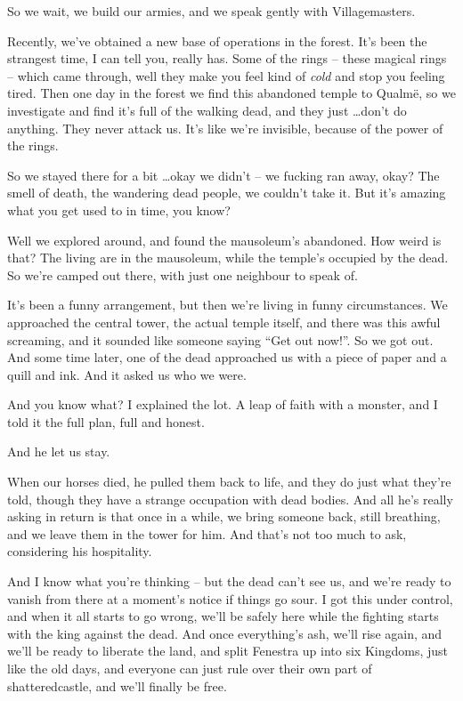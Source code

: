 \begin{multicols}{2}
\begin{exampletext}
	So we wait, we build our armies, and we speak gently with Villagemasters.

	Recently, we've obtained a new base of operations in the forest.
	It's been the strangest time, I can tell you, really has.
	Some of the rings -- these magical rings -- which came through, well they make you feel kind of \emph{cold} and stop you feeling tired.
	Then one day in the forest we find this abandoned temple to Qualm\"{e}, so we investigate and find it's full of the walking dead, and they just \ldots don't do anything.
	They never attack us.
	It's like we're invisible, because of the power of the rings.


	So we stayed there for a bit \ldots okay we didn't -- we fucking ran away, okay?  The smell of death, the wandering dead people, we couldn't take it.
But it's amazing what you get used to in time, you know?

	Well we explored around, and found the mausoleum's abandoned.
How weird is that?
The living are in the mausoleum, while the temple's occupied by the dead.
So we're camped out there, with just one neighbour to speak of.

	It's been a funny arrangement, but then we're living in funny circumstances.  We approached the central tower, the actual temple itself, and there was this awful screaming, and it sounded like someone saying ``Get out now!''.  So we got out.  And some time later, one of the dead approached us with a piece of paper and a quill and ink.  And it asked us who we were.

	And you know what?  I explained the lot.  A leap of faith with a monster, and I told it the full plan, full and honest.

	And he let us stay.

	When our horses died, he pulled them back to life, and they do just what they're told, though they have a strange occupation with dead bodies.  And all he's really asking in return is that once in a while, we bring someone back, still breathing, and we leave them in the tower for him.  And that's not too much to ask, considering his hospitality.

	And I know what you're thinking -- but the dead can't see us, and we're ready to vanish from there at a moment's notice if things go sour.  I got this under control, and when it all starts to go wrong, we'll be safely here while the fighting starts with the king against the dead.  And once everything's ash, we'll rise again, and we'll be ready to liberate the land, and split Fenestra up into six Kingdoms, just like the old days, and everyone can just rule over their own part of \gls{shatteredcastle}, and we'll finally be free.


\end{exampletext}
\end{multicols}

